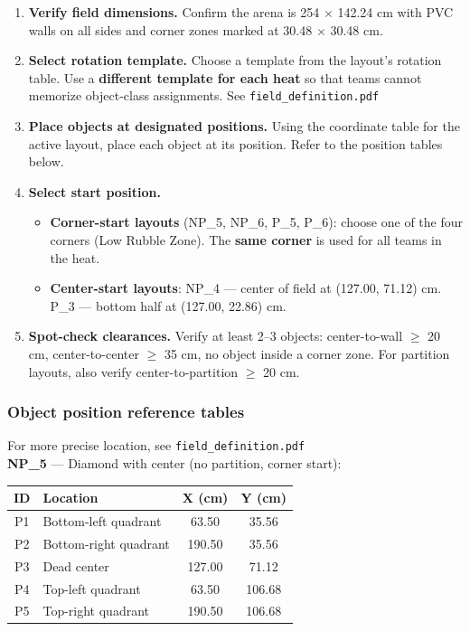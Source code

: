 \documentclass[a4]{article}
\begin{document}
\begin{enumerate}
    \item \textbf{Verify field dimensions.} Confirm the arena is 254 $\times$ 142.24 cm with PVC walls on all sides and corner zones marked at 30.48 $\times$ 30.48 cm.    
    \item \textbf{Select rotation template.} Choose a template from the layout's rotation table. Use a \textbf{different template for each heat} so that teams cannot memorize object-class assignments. See \texttt{field\_definition.pdf}

    \item \textbf{Place objects at designated positions.} Using the coordinate table for the active layout, place each object at its position. Refer to the position tables below.

    \item \textbf{Select start position.}
    \begin{itemize}
        \item \textbf{Corner-start layouts} (NP\_5, NP\_6, P\_5, P\_6): choose one of the four corners (Low Rubble Zone). The \textbf{same corner} is used for all teams in the heat.
        \item \textbf{Center-start layouts}: NP\_4 --- center of field at (127.00, 71.12) cm. P\_3 --- bottom half at (127.00, 22.86) cm.
    \end{itemize}

    \item \textbf{Spot-check clearances.} Verify at least 2--3 objects: center-to-wall $\geq$ 20 cm, center-to-center $\geq$ 35 cm, no object inside a corner zone. For partition layouts, also verify center-to-partition $\geq$ 20 cm.
\end{enumerate}

\subsubsection*{Object position reference tables}
For more precise location, see \texttt{field\_definition.pdf}\\

\textbf{NP\_5} --- Diamond with center (no partition, corner start):

\begin{table}[H]
\centering
\begin{tabular}{clcc}
\toprule
\textbf{ID} & \textbf{Location} & \textbf{X (cm)} & \textbf{Y (cm)} \\
\midrule
P1 & Bottom-left quadrant & 63.50 & 35.56 \\
P2 & Bottom-right quadrant & 190.50 & 35.56 \\
P3 & Dead center & 127.00 & 71.12 \\
P4 & Top-left quadrant & 63.50 & 106.68 \\
P5 & Top-right quadrant & 190.50 & 106.68 \\
\bottomrule
\end{tabular}
\end{table}
\end{document}
